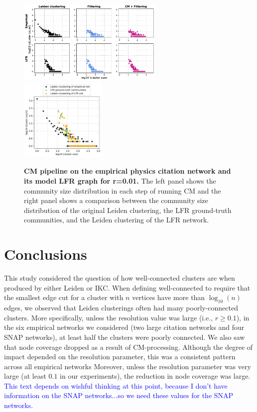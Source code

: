 \documentclass[11pt]{article}   	%
\begin{document}
\begin{figure}[h!]
\centering
\includegraphics[width=0.62\textwidth]{figs/cit_hepph_cm_steps_lfr01.pdf}
\includegraphics[width=0.37\textwidth]{figs/cit_hepph_01_cm_size.pdf}
\caption[CM pipeline on the empirical High Energy Physics Citation network and its model LFR graph for r=0.01]{\textbf{CM pipeline on the empirical physics citation network and its model LFR graph for r=0.01.} The left panel shows the community size distribution in each step of running CM and the right panel shows a comparison between the community size distribution of the original Leiden clustering, the LFR ground-truth communities, and the Leiden clustering of the LFR network.}
\label{fig:hepph-cm-lfr-01}
\end{figure}

\section{Conclusions}
This study considered the question of how well-connected clusters are when produced by either Leiden or IKC.
When defining well-connected to require  that the smallest edge cut for a cluster with $n$ vertices  have more than $\log_{10}(n)$ edges, we observed that Leiden clusterings
often had many poorly-connected clusters. More specifically, unless the resolution value was large (i.e., $r \geq 0.1$), in the six empirical networks we 
considered (two large citation networks and four SNAP networks), at least half the clusters were poorly connected.
We also saw that node coverage dropped as a result of CM-processing.
Although the degree of impact depended on the resolution parameter, this was a consistent pattern across all empirical networks
Moreover, unless the resolution parameter was very large (at least $0.1$ in our experiments), the reduction in node coverage was large.
\textcolor{blue}{This text depends on wishful thinking at this point, because I don't have information on the SNAP networks...so we need these values for the SNAP networks.}
\end{document}
